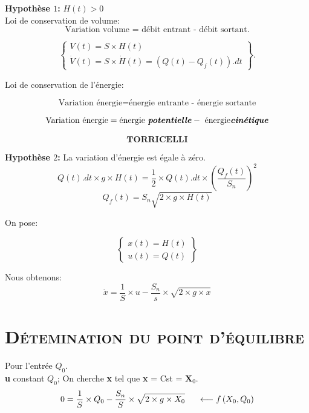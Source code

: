 \textbf{Hypothèse $1$:} \hspace{2mm} $H(t)>0$\\

Loi de conservation de volume:
\[\text{Variation volume $=$ débit entrant - débit sortant.}\]
\begin{center}

$$\left\{
\begin{array}{l}
    V(t)=S\times H(t)\\
    \dot{V}(t)=S\times \dot{H}(t)=(Q(t)-Q_f(t)).dt

\end{array}
\right\}.$$

\end{center}

Loi de conservation de l'énergie: 

\[\text{Variation énergie} = \text{énergie entrante - énergie sortante}\]

\[\text{Variation énergie} = \text{énergie \textit{\textbf{potentielle}}} -\text{ énergie\textit{\textbf{cinétique}}}\]

\[\textbf{TORRICELLI}\]

\textbf{Hypothèse $2$:} \indent La variation d'énergie est égale à zéro.\\

\[Q(t).dt\times g\times H(t)= \frac{1}{2}\times Q(t).dt \times \left(  \frac{Q_f(t)}{S_n}\right)^2\]
\[Q_f(t)=S_n\sqrt{2\times g \times H(t)}\]

On pose: 

$$\left\{
\begin{array}{l}
    x(t)=H(t)\\
    u(t)=Q(t)

\end{array}
\right\}$$

Nous obtenons: \[\dot{x}=\frac{1}{S}\times u - \frac{S_n}{s}\times \sqrt{2\times g \times x}\]


\section{\textsc{Détemination du point d'équilibre}}

Pour l'entrée $Q_0$.\\

\textbf{u} constant $Q_0$; On cherche \textbf{x} tel que \textbf{x} = Cst = $\textbf{X}_0$.\\

\[ 0=\frac{1}{S} \times Q_0 - \frac{S_n}{S} \times \sqrt{2 \times g \times X_0} \indent \longleftarrow f
\left(X_0,Q_0 \right) \]

